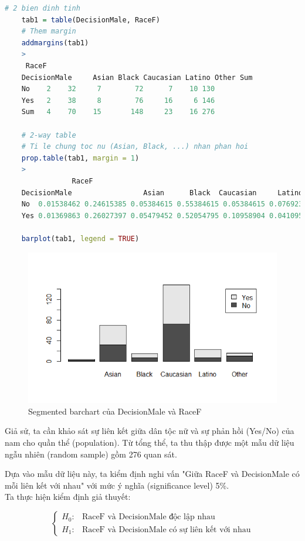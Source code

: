 \documentclass[a4paper,12pt]{article}
\begin{document}
	\begin{lstlisting}[language=R]
	# 2 bien dinh tinh
	tab1 = table(DecisionMale, RaceF)
	# Them margin
	addmargins(tab1)
	>
	 RaceF
	DecisionMale     Asian Black Caucasian Latino Other Sum
	No    2    32     7        72      7    10 130
	Yes   2    38     8        76     16     6 146
	Sum   4    70    15       148     23    16 276
	
	# 2-way table
	# Ti le chung toc nu (Asian, Black, ...) nhan phan hoi
	prop.table(tab1, margin = 1)
	>
	            RaceF
	DecisionMale                 Asian      Black  Caucasian     Latino      Other
	No  0.01538462 0.24615385 0.05384615 0.55384615 0.05384615 0.07692308
	Yes 0.01369863 0.26027397 0.05479452 0.52054795 0.10958904 0.04109589
	
	barplot(tab1, legend = TRUE)
	\end{lstlisting}
	\begin{figure}[H]
		\centering
		\includegraphics[width=0.7\linewidth]{segmented_barchart}
		\caption{Segmented barchart của DecisionMale và RaceF}
		\label{fig:barchart}
	\end{figure}
	
	Giả sử, ta cần khảo sát sự liên kết giữa dân tộc nữ và sự phản hồi (Yes/No) của nam cho quần thể (population). Từ tổng thể, ta thu thập được một mẫu dữ liệu ngẫu nhiên (random sample) gồm 276 quan sát.
	
	Dựa vào mẫu dữ liệu này, ta kiểm định nghi vấn "Giữa RaceF và DecisionMale có mỗi liên kết với nhau" với mức ý nghĩa (significance level) 5\%.\\
	
	Ta thực hiện kiểm định giả thuyết:
	
	\begin{equation*}
	\begin{cases}
	H_0: & \text{RaceF và DecisionMale độc lập nhau}\\
	H_1: & \text{RaceF và DecisionMale có sự liên kết với nhau}
	\end{cases}
	\end{equation*}
	
\end{document}
